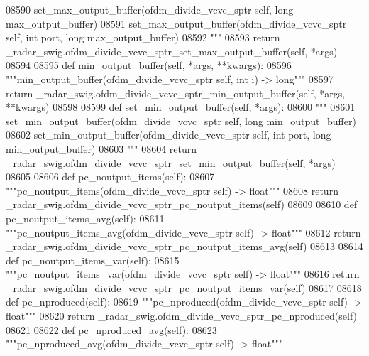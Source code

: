 \begin{DoxyCode}
{{{{{{{{{{{{{{{{{{{{{{{{{{{{08590 \textcolor{stringliteral}{        set\_max\_output\_buffer(ofdm\_divide\_vcvc\_sptr self, long max\_output\_buffer)}
08591 \textcolor{stringliteral}{        set\_max\_output\_buffer(ofdm\_divide\_vcvc\_sptr self, int port, long max\_output\_buffer)}
08592 \textcolor{stringliteral}{        """}
08593         \textcolor{keywordflow}{return} \_radar\_swig.ofdm\_divide\_vcvc\_sptr\_set\_max\_output\_buffer(self, *args)
08594 
08595     \textcolor{keyword}{def }min_output_buffer(self, *args, **kwargs):
08596         \textcolor{stringliteral}{"""min\_output\_buffer(ofdm\_divide\_vcvc\_sptr self, int i) -> long"""}
08597         \textcolor{keywordflow}{return} \_radar\_swig.ofdm\_divide\_vcvc\_sptr\_min\_output\_buffer(self, *args, **kwargs)
08598 
08599     \textcolor{keyword}{def }set_min_output_buffer(self, *args):
08600         \textcolor{stringliteral}{"""}
08601 \textcolor{stringliteral}{        set\_min\_output\_buffer(ofdm\_divide\_vcvc\_sptr self, long min\_output\_buffer)}
08602 \textcolor{stringliteral}{        set\_min\_output\_buffer(ofdm\_divide\_vcvc\_sptr self, int port, long min\_output\_buffer)}
08603 \textcolor{stringliteral}{        """}
08604         \textcolor{keywordflow}{return} \_radar\_swig.ofdm\_divide\_vcvc\_sptr\_set\_min\_output\_buffer(self, *args)
08605 
08606     \textcolor{keyword}{def }pc_noutput_items(self):
08607         \textcolor{stringliteral}{"""pc\_noutput\_items(ofdm\_divide\_vcvc\_sptr self) -> float"""}
08608         \textcolor{keywordflow}{return} \_radar\_swig.ofdm\_divide\_vcvc\_sptr\_pc\_noutput\_items(self)
08609 
08610     \textcolor{keyword}{def }pc_noutput_items_avg(self):
08611         \textcolor{stringliteral}{"""pc\_noutput\_items\_avg(ofdm\_divide\_vcvc\_sptr self) -> float"""}
08612         \textcolor{keywordflow}{return} \_radar\_swig.ofdm\_divide\_vcvc\_sptr\_pc\_noutput\_items\_avg(self)
08613 
08614     \textcolor{keyword}{def }pc_noutput_items_var(self):
08615         \textcolor{stringliteral}{"""pc\_noutput\_items\_var(ofdm\_divide\_vcvc\_sptr self) -> float"""}
08616         \textcolor{keywordflow}{return} \_radar\_swig.ofdm\_divide\_vcvc\_sptr\_pc\_noutput\_items\_var(self)
08617 
08618     \textcolor{keyword}{def }pc_nproduced(self):
08619         \textcolor{stringliteral}{"""pc\_nproduced(ofdm\_divide\_vcvc\_sptr self) -> float"""}
08620         \textcolor{keywordflow}{return} \_radar\_swig.ofdm\_divide\_vcvc\_sptr\_pc\_nproduced(self)
08621 
08622     \textcolor{keyword}{def }pc_nproduced_avg(self):
08623         \textcolor{stringliteral}{"""pc\_nproduced\_avg(ofdm\_divide\_vcvc\_sptr self) -> float"""}
}}}}}}}}}}}}}}}}}}}}}}}}}}}}
\end{DoxyCode}
